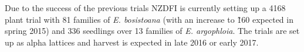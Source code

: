 Due to the success of the previous trials NZDFI is currently setting up a 4168
plant trial with 81 families of \textit{E. bosistoana} (with an increase to \~160
expected in spring 2015) and 336 seedlings over 13 families of \textit{E.
argophloia}. The trials are set up as alpha lattices and harvest is expected in
late 2016 or early 2017. 
